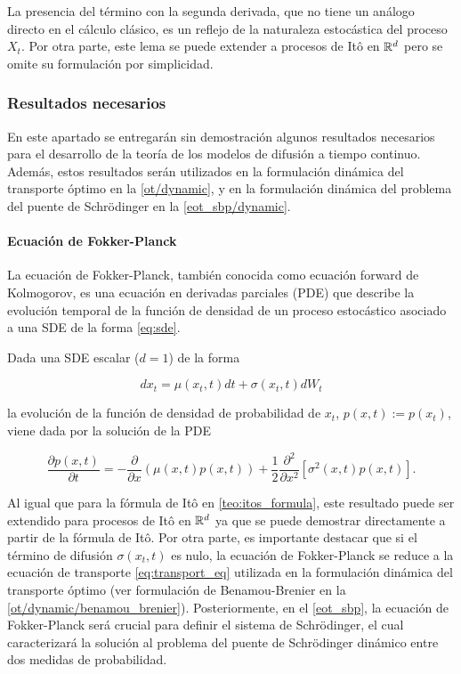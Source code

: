 La presencia del término con la segunda derivada, que no tiene un análogo directo en el cálculo clásico, es un reflejo de la naturaleza estocástica del proceso $X_t$. Por otra parte, este lema se puede extender a procesos de Itô en $\mathbb{R}^d$ pero se omite su formulación por simplicidad.

\subsubsection{Resultados necesarios}

En este apartado se entregarán sin demostración algunos resultados necesarios para el desarrollo de la teoría de los modelos de difusión a tiempo continuo. Además, estos resultados serán  utilizados en la formulación dinámica del transporte óptimo en la \autoref{ot/dynamic}, y en la formulación dinámica del problema del puente de Schrödinger en la \autoref{eot_sbp/dynamic}.

\paragraph{Ecuación de Fokker-Planck}
\label{subsec:fokker_planck}
La ecuación de Fokker-Planck, también conocida como ecuación forward de Kolmogorov, es una ecuación en derivadas parciales (PDE)  que describe la evolución temporal de la función de densidad de un proceso estocástico asociado a una SDE de la forma \eqref{eq:sde}.

\begin{teo}
    \label{teo:fokker_planck}
    Dada una SDE escalar ($d=1$) de la forma

    \begin{equation}
        dx_t = \mu(x_t,t)dt + \sigma(x_t,t)dW_t
    \end{equation}

    la evolución de la función de densidad de probabilidad de $x_t$, $p(x,t) := p(x_t)$, viene dada por la solución de la PDE

    \begin{equation}
        \label{eq:fokker_planck}
        \frac{\partial p(x,t)}{\partial t} = -\frac{\partial}{\partial x} (\mu(x, t) p(x, t)) + \frac{1}{2} \frac{\partial^2}{\partial x^2} [\sigma^2(x, t) p(x, t)].
    \end{equation}

\end{teo}

Al igual que para la fórmula de Itô en \eqref{teo:itos_formula}, este resultado puede ser extendido para procesos de Itô en $\mathbb{R}^d$ ya que se puede demostrar directamente a partir de la fórmula de Itô. Por otra parte, es importante destacar que si el término de difusión $\sigma(x_t,t)$ es nulo, la ecuación de Fokker-Planck se reduce a la ecuación de transporte \eqref{eq:transport_eq} utilizada en la formulación dinámica del transporte óptimo (ver formulación de Benamou-Brenier en la \autoref{ot/dynamic/benamou_brenier}). Posteriormente, en el \autoref{eot_sbp}, la ecuación de Fokker-Planck será crucial para definir el sistema de Schrödinger, el cual caracterizará la solución al problema del puente de Schrödinger dinámico entre dos medidas de probabilidad.

